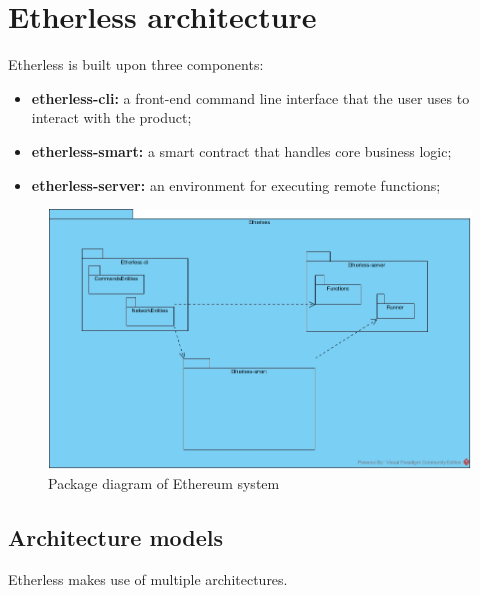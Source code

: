 \section{Etherless architecture}
Etherless is built upon three components:
\begin{itemize}
	\item \textbf{etherless-cli:} a front-end command line interface that the user uses to interact with the product;
	\item \textbf{etherless-smart:} a smart contract that handles core business logic;
	\item \textbf{etherless-server:} an environment for executing remote functions;
\end{itemize}
\begin{figure}
	\centering
	\includegraphics[width=\textwidth]{res/img/packageDiagram.jpg}
	\caption{Package diagram of Ethereum system}
\end{figure}
\subsection{Architecture models}
Etherless makes use of multiple architectures.
